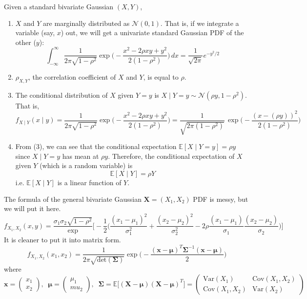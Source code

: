 \documentclass{article}
\begin{document}
  \begin{proposition}
  Given a standard bivariate Gaussian $(X, Y)$, 
  \begin{enumerate}
      \item $X$ and $Y$ are marginally distributed as $\mathcal{N}(0, 1)$. That is, if we integrate a variable (say, $x$) out, we will get a univariate standard Gaussian PDF of the other ($y$): 
      \[\int_{-\infty}^\infty \frac{1}{2 \pi \sqrt{1 - \rho^2}} \exp \bigg( -\frac{x^2 - 2 \rho x y + y^2}{2 (1 - \rho^2)}\bigg) \,dx = \frac{1}{\sqrt{2 \pi}} e^{-y^2 / 2}\]
      \item $\rho_{X, Y}$, the correlation coefficient of $X$ and $Y$, is equal to $\rho$. 
      \item The conditional distribution of $X$ given $Y = y$ is $X \mid Y = y \sim \mathcal{N} (\rho y, 1 - \rho^2)$. That is, 
      \[f_{X \mid Y} (x \mid y) = \frac{1}{2 \pi \sqrt{1 - \rho^2}} \exp \bigg( -\frac{x^2 - 2 \rho x y + y^2}{2 (1 - \rho^2)}\bigg) = \frac{1}{ \sqrt{2 \pi (1 - \rho^2)}} \, \exp\bigg( - \frac{(x - (\rho y))^2}{2 (1 - \rho^2)} \bigg)\]
      \item From (3), we can see that the conditional expectation $\mathbb{E}[X \mid Y = y] = \rho y$ since $X \mid Y = y$ has mean at $\rho y$. Therefore, the conditional expectation of $X$ given $Y$ (which is a random variable) is 
      \[\mathbb{E}[X \mid Y] = \rho Y\]
      i.e. $\mathbb{E}[X \mid Y]$ is a linear function of $Y$. 
  \end{enumerate}
  \end{proposition}

  The formula of the general bivariate Gaussian $\mathbf{X} = (X_1, X_2)$ PDF is messy, but we will put it here. 
  \[f_{X_1, X_2} (x, y) = \frac{\sigma_1 \sigma_2 \sqrt{1 - \rho^2}} \exp \bigg[ -\frac{1}{2} \bigg( \frac{(x_1 - \mu_1)^2}{\sigma_1^2} + \frac{(x_2 - \mu_2)^2}{\sigma_2^2} - 2 \rho \frac{(x_1 - \mu_1)}{\sigma_1} \frac{(x_2 - \mu_2)}{\sigma_2}\bigg)\bigg]\]
  It is cleaner to put it into matrix form. 
  \[f_{X_1, X_2} (x_1 , x_2) = \frac{1}{2 \pi \sqrt{\mathrm{det}(\boldsymbol{\Sigma})}} \exp \bigg( - \frac{(\mathbf{x} - \boldsymbol{\mu})^T \boldsymbol{\Sigma}^{-1} (\mathbf{x} - \boldsymbol{\mu})}{2} \bigg) \]
  where 
  \[\mathbf{x} = \begin{pmatrix} x_1 \\ x_2 \end{pmatrix}, \;\; \boldsymbol{\mu} = \begin{pmatrix} \mu_1 \\ mu_2 \end{pmatrix} , \;\; \boldsymbol{\Sigma} = \mathbb{E}\big[ (\mathbf{X} - \boldsymbol{\mu}) (\mathbf{X} - \boldsymbol{\mu})^T \big] = \begin{pmatrix} \mathrm{Var}(X_1) & \mathrm{Cov}(X_1, X_2) \\
  \mathrm{Cov}(X_1, X_2) & \mathrm{Var}(X_2) \end{pmatrix}\]
\end{document}
